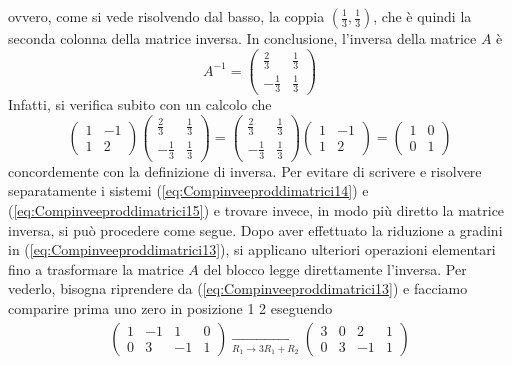 ovvero, come si vede risolvendo dal basso, la coppia
$\left(\frac{1}{3},\frac{1}{3}\right)$, che è quindi la seconda
colonna della matrice inversa. In conclusione, l'inversa della
matrice $A$ è
\begin{equation*}
  A^{-1}=
  \begin{pmatrix}
    \frac{2}{3} & \frac{1}{3}\\
    -\frac{1}{3} & \frac{1}{3}
  \end{pmatrix}
\end{equation*}
Infatti, si verifica subito con un calcolo che
\begin{equation*}
  \begin{pmatrix}
    1 & -1\\
    1 & 2
  \end{pmatrix}
  \begin{pmatrix}
    \frac{2}{3} & \frac{1}{3}\\
    -\frac{1}{3} & \frac{1}{3}
  \end{pmatrix}=\begin{pmatrix}
    \frac{2}{3} & \frac{1}{3}\\
    -\frac{1}{3} & \frac{1}{3}
  \end{pmatrix}\begin{pmatrix}
    1 & -1\\
    1 & 2
  \end{pmatrix}=
  \begin{pmatrix}
    1 & 0\\
    0 & 1
  \end{pmatrix}
\end{equation*}
concordemente con la definizione di inversa.
Per evitare di scrivere e risolvere separatamente i sistemi
(\ref{eq:Compinveeproddimatrici14}) e 
(\ref{eq:Compinveeproddimatrici15}) e trovare invece, in modo
più diretto la matrice inversa, si può procedere come segue. Dopo
aver effettuato la riduzione a gradini in
(\ref{eq:Compinveeproddimatrici13}), si applicano ulteriori
operazioni elementari fino a trasformare la matrice $A$ del blocco
legge direttamente l'inversa. Per vederlo, bisogna riprendere da 
(\ref{eq:Compinveeproddimatrici13}) e facciamo comparire prima
uno zero in posizione 1 2 eseguendo
\begin{eqnarray*}  
  \left(
  \begin{array}{cc|cc}
    1 & -1 & 1 & 0 \\
    0 & 3 & -1 & 1
  \end{array}\right) \underset{R_1\to 3R_1+R_2}{\to}\left(
  \begin{array}{cc|cc}
    3 & 0 & 2 & 1\\
    0 & 3 & -1 & 1
  \end{array}\right)
\end{eqnarray*}
